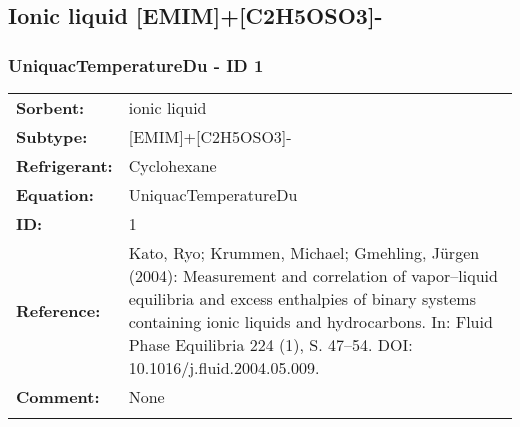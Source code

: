 \subsection{Ionic liquid [EMIM]+[C2H5OSO3]-}
%
\subsubsection{UniquacTemperatureDu - ID 1}
%
\begin{tabular}[l]{|lp{11.5cm}|}
\hline
\addlinespace

\textbf{Sorbent:} & ionic liquid \\
\textbf{Subtype:} & [EMIM]+[C2H5OSO3]- \\
\textbf{Refrigerant:} & Cyclohexane \\
\textbf{Equation:} & UniquacTemperatureDu \\
\textbf{ID:} & 1 \\
\textbf{Reference:} & Kato, Ryo; Krummen, Michael; Gmehling, Jürgen (2004): Measurement and correlation of vapor–liquid equilibria and excess enthalpies of binary systems containing ionic liquids and hydrocarbons. In: Fluid Phase Equilibria 224 (1), S. 47–54. DOI: 10.1016/j.fluid.2004.05.009. \\
\textbf{Comment:} & None \\

\addlinespace
\hline
\end{tabular}
\newline

